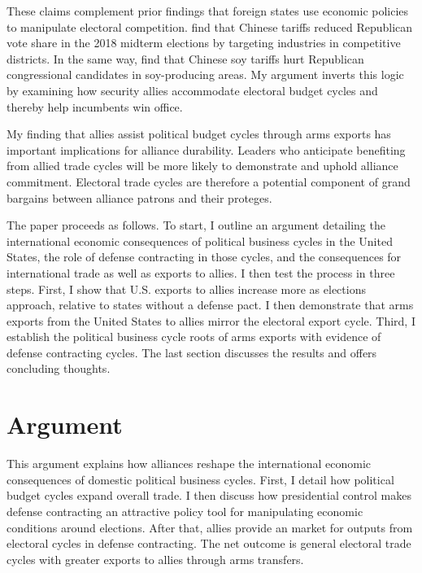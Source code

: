 \documentclass[12pt]{article}
\begin{document}
These claims complement prior findings that foreign states use economic policies to manipulate electoral competition. 
\citet{KimMargalit2021} find that Chinese tariffs reduced Republican vote share in the 2018 midterm elections by targeting industries in competitive districts.
In the same way, \citet{ChyzhUrbatsch2021} find that Chinese soy tariffs hurt Republican congressional candidates in soy-producing areas. 
My argument inverts this logic by examining how security allies accommodate electoral budget cycles and thereby help incumbents win office. 


My finding that allies assist political budget cycles through arms exports has important implications for alliance durability. 
Leaders who anticipate benefiting from allied trade cycles will be more likely to demonstrate and uphold alliance commitment. 
Electoral trade cycles are therefore a potential component of grand bargains between alliance patrons and their proteges. 


The paper proceeds as follows. 
To start, I outline an argument detailing the international economic consequences of political business cycles in the United States, the role of defense contracting in those cycles, and the consequences for international trade as well as exports to allies.
I then test the process in three steps. 
First, I show that U.S. exports to allies increase more as elections approach, relative to states without a defense pact. 
I then demonstrate that arms exports from the United States to allies mirror the electoral export cycle.
Third, I establish the political business cycle roots of arms exports with evidence of defense contracting cycles.
The last section discusses the results and offers concluding thoughts.


\section{Argument}


This argument explains how alliances reshape the international economic consequences of domestic political business cycles. 
First, I detail how political budget cycles expand overall trade.
I then discuss how presidential control makes defense contracting an attractive policy tool for manipulating economic conditions around elections. 
After that, allies provide an market for outputs from electoral cycles in defense contracting. 
The net outcome is general electoral trade cycles with greater exports to allies through arms transfers. 
\end{document}

